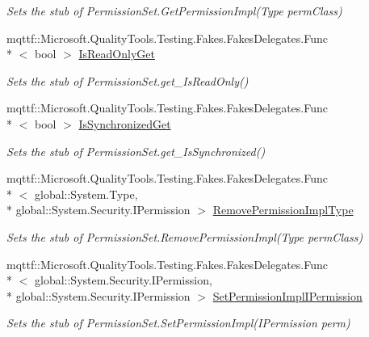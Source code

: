 \begin{DoxyCompactItemize}
\begin{DoxyCompactList}\small\item\em Sets the stub of Permission\-Set.\-Get\-Permission\-Impl(\-Type perm\-Class)\end{DoxyCompactList}\item 
mqttf\-::\-Microsoft.\-Quality\-Tools.\-Testing.\-Fakes.\-Fakes\-Delegates.\-Func\\*
$<$ bool $>$ \hyperlink{class_system_1_1_security_1_1_fakes_1_1_stub_permission_set_a1bb769b58baec67379ac0daaf0825932}{Is\-Read\-Only\-Get}
\begin{DoxyCompactList}\small\item\em Sets the stub of Permission\-Set.\-get\-\_\-\-Is\-Read\-Only()\end{DoxyCompactList}\item 
mqttf\-::\-Microsoft.\-Quality\-Tools.\-Testing.\-Fakes.\-Fakes\-Delegates.\-Func\\*
$<$ bool $>$ \hyperlink{class_system_1_1_security_1_1_fakes_1_1_stub_permission_set_aa0d3d217f0205d6e2733e7d9a21dd75d}{Is\-Synchronized\-Get}
\begin{DoxyCompactList}\small\item\em Sets the stub of Permission\-Set.\-get\-\_\-\-Is\-Synchronized()\end{DoxyCompactList}\item 
mqttf\-::\-Microsoft.\-Quality\-Tools.\-Testing.\-Fakes.\-Fakes\-Delegates.\-Func\\*
$<$ global\-::\-System.\-Type, \\*
global\-::\-System.\-Security.\-I\-Permission $>$ \hyperlink{class_system_1_1_security_1_1_fakes_1_1_stub_permission_set_aace89d4cf1869c911520b4bd114370ec}{Remove\-Permission\-Impl\-Type}
\begin{DoxyCompactList}\small\item\em Sets the stub of Permission\-Set.\-Remove\-Permission\-Impl(\-Type perm\-Class)\end{DoxyCompactList}\item 
mqttf\-::\-Microsoft.\-Quality\-Tools.\-Testing.\-Fakes.\-Fakes\-Delegates.\-Func\\*
$<$ global\-::\-System.\-Security.\-I\-Permission, \\*
global\-::\-System.\-Security.\-I\-Permission $>$ \hyperlink{class_system_1_1_security_1_1_fakes_1_1_stub_permission_set_ad0d859f30e87a567cdddc37ef58e5220}{Set\-Permission\-Impl\-I\-Permission}
\begin{DoxyCompactList}\small\item\em Sets the stub of Permission\-Set.\-Set\-Permission\-Impl(\-I\-Permission perm)\end{DoxyCompactList}\item 

\end{DoxyCompactItemize}
